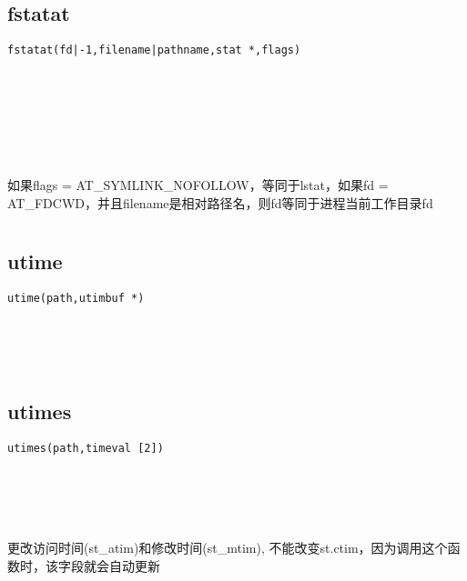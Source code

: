 \documentclass[10pt,a4paper]{article}
\begin{document}
\subsection{fstatat}
\begin{spacing}{2.0}
\lstset{language=C,numbers=none}
\begin{lstlisting}
fstatat(fd|-1,filename|pathname,stat *,flags)
\end{lstlisting}
{\large\color[rgb]{0.2,0.4,0.6}{fd|-1:}} \\
{\large\color[rgb]{0.2,0.4,0.6}{filename|pathname:}} \\
{\large\color[rgb]{0.2,0.4,0.6}{*:}} \\
{\large\color[rgb]{0.2,0.4,0.6}{flags:}}
\paragraph{ \ \ }如果flags = AT\_SYMLINK\_NOFOLLOW，等同于lstat，如果fd = AT\_FDCWD，并且filename是相对路径名，则fd等同于进程当前工作目录fd
\end{spacing}

\section{\color[rgb]{0.2,0.4,0.6}{文件时间属性更改}}
\subsection{utime}
\begin{spacing}{2.0}
\lstset{language=C,numbers=none}
\begin{lstlisting}
utime(path,utimbuf *)
\end{lstlisting}
{\large\color[rgb]{0.2,0.4,0.6}{path:}} \\
{\large\color[rgb]{0.2,0.4,0.6}{*:}}
\paragraph{ \ \ }
\end{spacing}

\subsection{utimes}
\begin{spacing}{2.0}
\lstset{language=C,numbers=none}
\begin{lstlisting}
utimes(path,timeval [2])
\end{lstlisting}
{\large\color[rgb]{0.2,0.4,0.6}{path:}} \\
{\large\color[rgb]{0.2,0.4,0.6}{[2]:}}
\paragraph{ \ \ }更改访问时间(st\_atim)和修改时间(st\_mtim), 不能改变st.ctim，因为调用这个函数时，该字段就会自动更新
\end{spacing}
\end{document}
